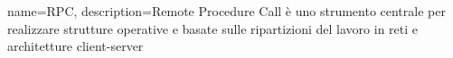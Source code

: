 {
	name={RPC},
	description={Remote Procedure Call è uno strumento centrale per realizzare strutture operative e basate sulle ripartizioni del lavoro in reti e architetture client-server}
}